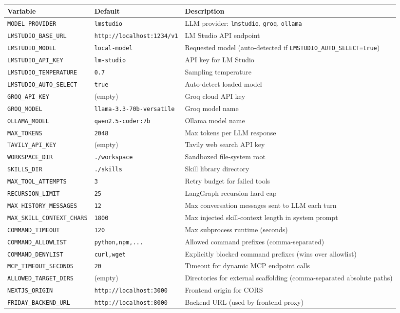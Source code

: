\documentclass[11pt,a4paper]{article}
\begin{document}
\begin{longtable}{@{}llp{6cm}@{}}
\toprule
\textbf{Variable} & \textbf{Default} & \textbf{Description} \\
\midrule
\endhead
\texttt{MODEL\_PROVIDER} & \texttt{lmstudio} & LLM provider: \texttt{lmstudio}, \texttt{groq}, \texttt{ollama} \\
\texttt{LMSTUDIO\_BASE\_URL} & \texttt{http://localhost:1234/v1} & LM Studio API endpoint \\
\texttt{LMSTUDIO\_MODEL} & \texttt{local-model} & Requested model (auto-detected if \texttt{LMSTUDIO\_AUTO\_SELECT=true}) \\
\texttt{LMSTUDIO\_API\_KEY} & \texttt{lm-studio} & API key for LM Studio \\
\texttt{LMSTUDIO\_TEMPERATURE} & \texttt{0.7} & Sampling temperature \\
\texttt{LMSTUDIO\_AUTO\_SELECT} & \texttt{true} & Auto-detect loaded model \\
\texttt{GROQ\_API\_KEY} & (empty) & Groq cloud API key \\
\texttt{GROQ\_MODEL} & \texttt{llama-3.3-70b-versatile} & Groq model name \\
\texttt{OLLAMA\_MODEL} & \texttt{qwen2.5-coder:7b} & Ollama model name \\
\texttt{MAX\_TOKENS} & \texttt{2048} & Max tokens per LLM response \\
\texttt{TAVILY\_API\_KEY} & (empty) & Tavily web search API key \\
\texttt{WORKSPACE\_DIR} & \texttt{./workspace} & Sandboxed file-system root \\
\texttt{SKILLS\_DIR} & \texttt{./skills} & Skill library directory \\
\texttt{MAX\_TOOL\_ATTEMPTS} & \texttt{3} & Retry budget for failed tools \\
\texttt{RECURSION\_LIMIT} & \texttt{25} & LangGraph recursion hard cap \\
\texttt{MAX\_HISTORY\_MESSAGES} & \texttt{12} & Max conversation messages sent to LLM each turn \\
\texttt{MAX\_SKILL\_CONTEXT\_CHARS} & \texttt{1800} & Max injected skill-context length in system prompt \\
\texttt{COMMAND\_TIMEOUT} & \texttt{120} & Max subprocess runtime (seconds) \\
\texttt{COMMAND\_ALLOWLIST} & \texttt{python,npm,...} & Allowed command prefixes (comma-separated) \\
\texttt{COMMAND\_DENYLIST} & \texttt{curl,wget} & Explicitly blocked command prefixes (wins over allowlist) \\
\texttt{MCP\_TIMEOUT\_SECONDS} & \texttt{20} & Timeout for dynamic MCP endpoint calls \\
\texttt{ALLOWED\_TARGET\_DIRS} & (empty) & Directories for external scaffolding (comma-separated absolute paths) \\
\texttt{NEXTJS\_ORIGIN} & \texttt{http://localhost:3000} & Frontend origin for CORS \\
\texttt{FRIDAY\_BACKEND\_URL} & \texttt{http://localhost:8000} & Backend URL (used by frontend proxy) \\
\bottomrule
\end{longtable}
\end{document}
